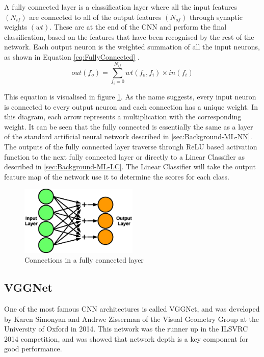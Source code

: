 \documentclass[12pt]{article}
\begin{document}
A fully connected layer is a classification layer where all the input features $(N_{if})$ are connected to all of the output features $(N_{of})$ through synaptic weights $(wt)$. These are at the end of the CNN and perform the final classification, based on the features that have been recognised by the rest of the network. Each output neuron is the weighted summation of all the input neurons, as shown in Equation \ref{eq:FullyConnected} \cite{SudaFpgaAccelerator}.
\begin{equation}
out(f_o)=\sum^{N_{if}}_{f_i=0}wt(f_o,f_i)\times in(f_i)
\label{eq:FullyConnected}
\end{equation}

This equation is visualised in figure \ref{fig:fc}. As the name suggests, every input neuron is connected to every output neuron and each connection has a unique weight. In this diagram, each arrow represents a multiplication with the corresponding weight. It can be seen that the fully connected is essentially the same as a layer of the standard artificial neural network described in \ref{sec:Background-ML-NN}. The outputs of the fully connected layer traverse through ReLU based activation function to the next fully connected layer or directly to a Linear Classifier as described in \ref{sec:Background-ML-LC}. The Linear Classifier will take the output feature map of the network use it to determine the scores for each class.

\begin{figure} [H]
\centering
\includegraphics[width=0.5\textwidth]{figures/fc.eps}
\caption{Connections in a fully connected layer}
\label{fig:fc}
\end{figure}

\subsection{VGGNet}
\label{sec:Background-VGGNet}

One of the most famous CNN architectures is called VGGNet, and was developed by  Karen Simonyan and Andrwe Zisserman of the Visual Geometry Group at the University of Oxford in 2014\cite{VGGNet}. This network was the runner up in the ILSVRC 2014 competition, and was showed that network depth is a key component for good performance.
\end{document}
